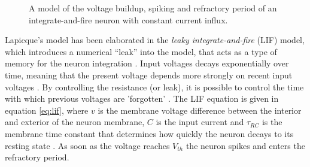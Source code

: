 \documentclass[report.tex]{subfiles}
\begin{document}
\begin{figure}
\centering

\caption{A model of the voltage buildup, spiking and refractory period
         of an integrate-and-fire  
         neuron with constant current influx.}
\label{fig:spiking}
\end{figure}

Lapicque's model has been elaborated in the \textit{leaky
integrate-and-fire} (LIF) 
model, which introduces a numerical ``leak''
into the model, that acts as a type of memory 
for the neuron integration \cite{Eliasmith2004, Eliasmith2015}.
Input voltages decays exponentially over time, meaning that the
present voltage depends more strongly on recent input voltages
\cite[p. 86]{Eliasmith2004}.
By controlling the resistance (or leak), it is possible to
control the time with which previous voltages are 'forgotten'
\cite{Eliasmith2004}.
The LIF equation is given in equation \ref{eq:lif}, where
$v$ is the membrane voltage difference between the interior
and exterior of the neuron membrane, $C$ is the input current
and $\tau_{RC}$ is the membrane time constant that determines how
quickly the neuron decays to its resting state \cite{Dayan2001, Eliasmith2004}.
As soon as the voltage reaches $V_{th}$ the neuron spikes and
enters the refractory period.
\end{document}
